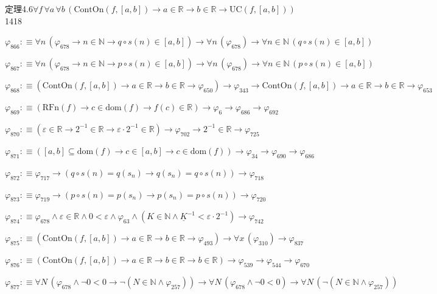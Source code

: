 \begin{fullproof}{定理4.6}{$\forall f\,\forall a\,\forall b\,(\mathrm{ContOn}(f,[a,b]) \to a \in \mathbb{R} \to b \in \mathbb{R} \to \mathrm{UC}(f,[a,b]))$}{1418}
\begin{abbrevlist}
\item $\varphi_{866} :\equiv \forall n\,(\varphi_{678} \to n \in \mathbb{N} \to q \circ s(n) \in [a,b]) \to \forall n\,(\varphi_{678}) \to \forall n \in \mathbb{N}\,(q \circ s(n) \in [a,b])$
\item $\varphi_{867} :\equiv \forall n\,(\varphi_{678} \to n \in \mathbb{N} \to p \circ s(n) \in [a,b]) \to \forall n\,(\varphi_{678}) \to \forall n \in \mathbb{N}\,(p \circ s(n) \in [a,b])$
\item $\varphi_{868} :\equiv (\mathrm{ContOn}(f,[a,b]) \to a \in \mathbb{R} \to b \in \mathbb{R} \to \varphi_{650}) \to \varphi_{343} \to \mathrm{ContOn}(f,[a,b]) \to a \in \mathbb{R} \to b \in \mathbb{R} \to \varphi_{653}$
\item $\varphi_{869} :\equiv (\mathrm{RFn}(f) \to c \in \mathrm{dom}(f) \to f(c) \in \mathbb{R}) \to \varphi_{6} \to \varphi_{686} \to \varphi_{692}$
\item $\varphi_{870} :\equiv (\varepsilon \in \mathbb{R} \to 2^{-1} \in \mathbb{R} \to \varepsilon \cdot 2^{-1} \in \mathbb{R}) \to \varphi_{702} \to 2^{-1} \in \mathbb{R} \to \varphi_{725}$
\item $\varphi_{871} :\equiv ([a,b] \subseteq \mathrm{dom}(f) \to c \in [a,b] \to c \in \mathrm{dom}(f)) \to \varphi_{34} \to \varphi_{690} \to \varphi_{686}$
\item $\varphi_{872} :\equiv \varphi_{717} \to (q \circ s(n) = q(s_{n}) \to q(s_{n}) = q \circ s(n)) \to \varphi_{718}$
\item $\varphi_{873} :\equiv \varphi_{719} \to (p \circ s(n) = p(s_{n}) \to p(s_{n}) = p \circ s(n)) \to \varphi_{720}$
\item $\varphi_{874} :\equiv \varphi_{678} \land \varepsilon \in \mathbb{R} \land 0 < \varepsilon \land \varphi_{63} \land (K \in \mathbb{N} \land \underline{K}^{-1} < \varepsilon \cdot 2^{-1}) \to \varphi_{742}$
\item $\varphi_{875} :\equiv (\mathrm{ContOn}(f,[a,b]) \to a \in \mathbb{R} \to b \in \mathbb{R} \to \varphi_{493}) \to \forall x\,(\varphi_{310}) \to \varphi_{837}$
\item $\varphi_{876} :\equiv (\mathrm{ContOn}(f,[a,b]) \to a \in \mathbb{R} \to b \in \mathbb{R} \to b \in \mathbb{R}) \to \varphi_{539} \to \varphi_{544} \to \varphi_{670}$
\item $\varphi_{877} :\equiv \forall N\,(\varphi_{678} \land \neg 0 < 0 \to \neg (N \in \mathbb{N} \land \varphi_{257})) \to \forall N\,(\varphi_{678} \land \neg 0 < 0) \to \forall N\,(\neg (N \in \mathbb{N} \land \varphi_{257}))$

\end{abbrevlist}
\end{fullproof}
